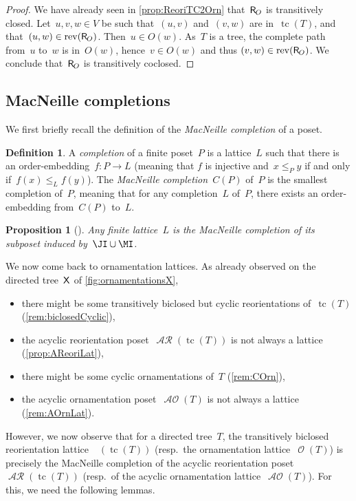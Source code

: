 \documentclass{amsart}
\newtheorem{proposition}[theorem]{Proposition}
\theoremstyle{definition}
\newtheorem{definition}[theorem]{Definition}
\renewcommand{\c}[1]{\mathcal{#1}} %
\DeclareMathOperator{\tc}{tc} %
\newcommand{\darkblue}{\color{darkblue}} %
\newcommand{\defn}[1]{\textsl{\darkblue #1}} %
\newcommand{\mymap}[2]{\mathsf{#1}_{\hspace{-.7pt}#2}}
\DeclareMathOperator{\Orn}{\c{O}}  %
\DeclareMathOperator{\AOrn}{\c{AO}}  %
\newcommand{\reori}[1]{\mymap{R}{#1}}  %
\DeclareMathOperator{\AReori}{\c{AR}}  %
\DeclareMathOperator{\Rbi}{\c{R}^{bi}}  %
\DeclareMathOperator{\rev}{rev} %
\newcommand{\Xgraph}{\sf X} %
\begin{document}
\begin{proof}
We have already seen in \cref{prop:ReoriTC2Orn} that~$\reori{O}$ is transitively closed.
Let~$u, v, w \in V$ be such that~$(u,v)$ and~$(v,w)$ are in~$\tc(T)$,
and that~$(u,w) \in \rev(\reori{O})$. Then~$u \in O(w)$. As~$T$ is a tree, the complete path from~$u$ to~$w$ is in~$O(w)$, hence~$v \in O(w)$ and thus $(v,w) \in \rev(\reori{O})$.
We conclude that~$\reori{O}$ is transitively coclosed.
\end{proof}


\subsection{MacNeille completions}
\label{subsec:MacNeilleT}

We first briefly recall the definition of the \emph{MacNeille completion} of a poset.

\begin{definition}
\label{def:MacNeilleCompletion}
A \defn{completion} of a finite poset~$P$ is a lattice~$L$ such that there is an order-embedding~$f : P \to L$ (meaning that $f$ is injective and~$x \le_P y$ if and only if~$f(x) \le_L f(y)$).
The \defn{MacNeille completion}~$C(P)$ of~$P$ is the smallest completion of~$P$, meaning that for any completion~$L$ of~$P$, there exists an order-embedding from~$C(P)$ to~$L$.
\end{definition}

\begin{proposition}[{\cite[Thm.~7.42]{DaveyPriestley}}]
\label{prop:MacNeilleCompletion}
Any finite lattice~$L$ is the MacNeille completion of its subposet induced by~$\JI \cup \MI$.
\end{proposition}

We now come back to ornamentation lattices.
As already observed on the directed tree~$\Xgraph$ of \cref{fig:ornamentationsX},
\begin{itemize}
\item there might be some transitively biclosed but cyclic reorientations of~$\tc(T)$ (\cref{rem:biclosedCyclic}),
\item the acyclic reorientation poset~$\AReori(\tc(T))$ is not always a lattice (\cref{prop:AReoriLat}),
\item there might be some cyclic ornamentations of~$T$ (\cref{rem:COrn}),
\item the acyclic ornamentation poset~$\AOrn(T)$ is not always a lattice (\cref{rem:AOrnLat}).
\end{itemize}
However, we now observe that for a directed tree~$T$, the transitively biclosed reorientation lattice~$\Rbi(\tc(T))$ (resp.~the ornamentation lattice~$\Orn(T)$) is precisely the MacNeille completion of the acyclic reorientation poset~$\AReori(\tc(T))$ (resp.~of the acyclic ornamentation lattice~$\AOrn(T)$).
For this, we need the following lemmas.
\end{document}
